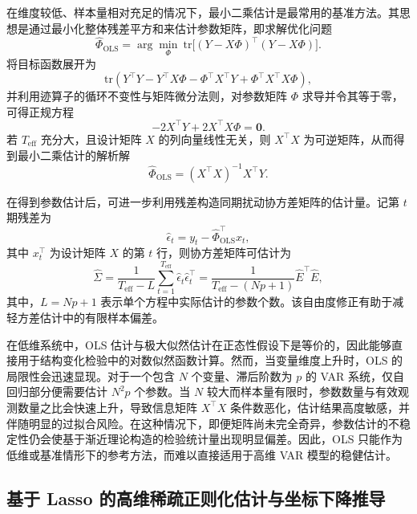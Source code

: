 在维度较低、样本量相对充足的情况下，最小二乘估计是最常用的基准方法。其思想是通过最小化整体残差平方和来估计参数矩阵，即求解优化问题
\begin{equation}
 \hat{\Phi}_{\mathrm{OLS}}=\arg\min_{\Phi}\ \mathrm{tr}\bigl[(Y-X\Phi)^{\top}(Y-X\Phi)\bigr].
\end{equation}
将目标函数展开为
\begin{equation}
 \mathrm{tr}\left(Y^{\top}Y-Y^{\top}X\Phi-\Phi^{\top}X^{\top}Y+\Phi^{\top}X^{\top}X\Phi\right),
\end{equation}
并利用迹算子的循环不变性与矩阵微分法则，对参数矩阵 $\Phi$ 求导并令其等于零，可得正规方程
\begin{equation}
 -2X^{\top}Y+2X^{\top}X\Phi=\bm{0}.
\end{equation}
若 $T_{\mathrm{eff}}$ 充分大，且设计矩阵 $X$ 的列向量线性无关，则 $X^{\top}X$ 为可逆矩阵，从而得到最小二乘估计的解析解
\begin{equation}
 \hat{\Phi}_{\mathrm{OLS}}=(X^{\top}X)^{-1}X^{\top}Y.
\end{equation}

在得到参数估计后，可进一步利用残差构造同期扰动协方差矩阵的估计量。记第 $t$ 期残差为
\begin{equation}
 \hat{\epsilon}_t=y_t-\hat{\Phi}_{\mathrm{OLS}}^{\top}x_t,
\end{equation}
其中 $x_t^{\top}$ 为设计矩阵 $X$ 的第 $t$ 行，则协方差矩阵可估计为
\begin{equation}
 \hat{\Sigma}=\frac{1}{T_{\mathrm{eff}}-L}\sum_{t=1}^{T_{\mathrm{eff}}}\hat{\epsilon}_t\hat{\epsilon}_t^{\top}
 =\frac{1}{T_{\mathrm{eff}}-(Np+1)}\hat{E}^{\top}\hat{E},
\end{equation}
其中，$L=Np+1$ 表示单个方程中实际估计的参数个数。该自由度修正有助于减轻方差估计中的有限样本偏差。

在低维系统中，OLS 估计与极大似然估计在正态性假设下是等价的，因此能够直接用于结构变化检验中的对数似然函数计算。然而，当变量维度上升时，OLS 的局限性会迅速显现。对于一个包含 $N$ 个变量、滞后阶数为 $p$ 的 VAR 系统，仅自回归部分便需要估计 $N^2p$ 个参数。当 $N$ 较大而样本量有限时，参数数量与有效观测数量之比会快速上升，导致信息矩阵 $X^{\top}X$ 条件数恶化，估计结果高度敏感，并伴随明显的过拟合风险。在这种情况下，即便矩阵尚未完全奇异，参数估计的不稳定性仍会使基于渐近理论构造的检验统计量出现明显偏差。因此，OLS 只能作为低维或基准情形下的参考方法，而难以直接适用于高维 VAR 模型的稳健估计。

\subsection{基于 Lasso 的高维稀疏正则化估计与坐标下降推导}

